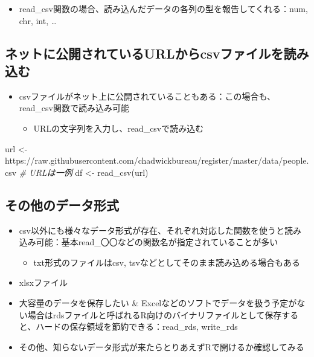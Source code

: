 \documentclass[
]{ltjsarticle}
\newenvironment{Shaded}{\begin{snugshade}}{\end{snugshade}}
\newcommand{\CommentTok}[1]{\textcolor[rgb]{0.56,0.35,0.01}{\textit{#1}}}
\newcommand{\FunctionTok}[1]{\textcolor[rgb]{0.00,0.00,0.00}{#1}}
\newcommand{\NormalTok}[1]{#1}
\newcommand{\OtherTok}[1]{\textcolor[rgb]{0.56,0.35,0.01}{#1}}
\newcommand{\StringTok}[1]{\textcolor[rgb]{0.31,0.60,0.02}{#1}}
\providecommand{\tightlist}{%
  \setlength{\itemsep}{0pt}\setlength{\parskip}{0pt}}
\begin{document}
\begin{itemize}
\tightlist
\item
  read\_csv関数の場合、読み込んだデータの各列の型を報告してくれる：num,
  chr, int, \ldots{}
\end{itemize}

\hypertarget{ux30cdux30c3ux30c8ux306bux516cux958bux3055ux308cux3066ux3044ux308burlux304bux3089csvux30d5ux30a1ux30a4ux30ebux3092ux8aadux307fux8fbcux3080}{%
\subsection{ネットに公開されているURLからcsvファイルを読み込む}\label{ux30cdux30c3ux30c8ux306bux516cux958bux3055ux308cux3066ux3044ux308burlux304bux3089csvux30d5ux30a1ux30a4ux30ebux3092ux8aadux307fux8fbcux3080}}

\begin{itemize}
\tightlist
\item
  csvファイルがネット上に公開されていることもある：この場合も、read\_csv関数で読み込み可能

  \begin{itemize}
  \tightlist
  \item
    URLの文字列を入力し、read\_csvで読み込む
  \end{itemize}
\end{itemize}

\begin{Shaded}
\begin{Highlighting}[]
\NormalTok{url }\OtherTok{\textless{}{-}} \StringTok{\textquotesingle{}https://raw.githubusercontent.com/chadwickbureau/register/master/data/people.csv\textquotesingle{}} \CommentTok{\# URLは一例}
\NormalTok{df }\OtherTok{\textless{}{-}} \FunctionTok{read\_csv}\NormalTok{(url)}
\end{Highlighting}
\end{Shaded}

\hypertarget{ux305dux306eux4ed6ux306eux30c7ux30fcux30bfux5f62ux5f0f}{%
\subsection{その他のデータ形式}\label{ux305dux306eux4ed6ux306eux30c7ux30fcux30bfux5f62ux5f0f}}

\begin{itemize}
\tightlist
\item
  csv以外にも様々なデータ形式が存在、それぞれ対応した関数を使うと読み込み可能：基本read\_〇〇などの関数名が指定されていることが多い

  \begin{itemize}
  \tightlist
  \item
    txt形式のファイルはcsv, tsvなどとしてそのまま読み込める場合もある
  \end{itemize}
\item
  xlsxファイル
\item
  大容量のデータを保存したい \&
  Excelなどのソフトでデータを扱う予定がない場合はrdsファイルと呼ばれるR向けのバイナリファイルとして保存すると、ハードの保存領域を節約できる：read\_rds,
  write\_rds
\item
  その他、知らないデータ形式が来たらとりあえずRで開けるか確認してみる
\end{itemize}
\end{document}

